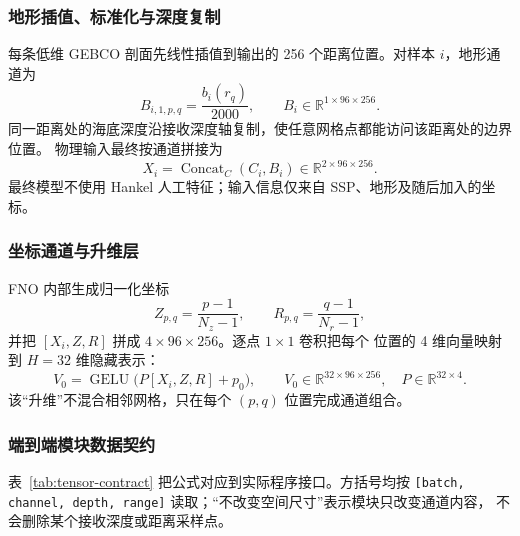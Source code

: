\documentclass[UTF8,11pt]{ctexart}
\begin{document}
\subsubsection{地形插值、标准化与深度复制}

每条低维 GEBCO 剖面先线性插值到输出的 256 个距离位置。对样本 $i$，地形通道为
\begin{equation}
  B_{i,1,p,q}=\frac{b_i(r_q)}{2000},\qquad
  B_i\in\mathbb{R}^{1\times96\times256}.
\end{equation}
同一距离处的海底深度沿接收深度轴复制，使任意网格点都能访问该距离处的边界位置。
物理输入最终按通道拼接为
\begin{equation}
  X_i=\operatorname{Concat}_{C}(C_i,B_i)
  \in\mathbb{R}^{2\times96\times256}.
\end{equation}
最终模型不使用 Hankel 人工特征；输入信息仅来自 SSP、地形及随后加入的坐标。

\subsubsection{坐标通道与升维层}

FNO 内部生成归一化坐标
\begin{equation}
  Z_{p,q}=\frac{p-1}{N_z-1},\qquad R_{p,q}=\frac{q-1}{N_r-1},
\end{equation}
并把 $[X_i,Z,R]$ 拼成 $4\times96\times256$。逐点 $1\times1$ 卷积把每个
位置的 4 维向量映射到 $H=32$ 维隐藏表示：
\begin{equation}
  V_0=\operatorname{GELU}\big(P[X_i,Z,R]+p_0\big),\qquad
  V_0\in\mathbb{R}^{32\times96\times256},\quad P\in\mathbb{R}^{32\times4}.
\end{equation}
该“升维”不混合相邻网格，只在每个 $(p,q)$ 位置完成通道组合。

\subsubsection{端到端模块数据契约}

表~\ref{tab:tensor-contract} 把公式对应到实际程序接口。方括号均按
\texttt{[batch, channel, depth, range]} 读取；“不改变空间尺寸”表示模块只改变通道内容，
不会删除某个接收深度或距离采样点。
\end{document}
